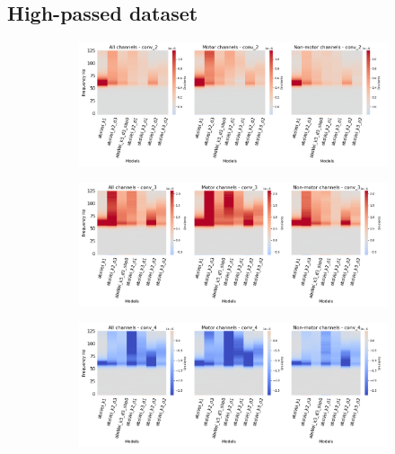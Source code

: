 \subsection*{High-passed dataset}\label{subsec:absVel-high-passed-dataset-appendixA}
\begin{figure}[!htpb]
\centering
\begin{subfigure}[a]{\textwidth}
   \includegraphics[width=1\linewidth]{img/appendix/A/conv-2/hp-m/absVel-model-gradients_all_kinds}
   \caption{}
   \label{fig:absVel-hp-grads-conv-2}
\end{subfigure}

\begin{subfigure}[b]{\textwidth}
   \includegraphics[width=1\linewidth]{img/appendix/A/conv-3/hp-m/absVel-model-gradients_all_kinds}
   \caption{}
   \label{fig:absVel-hp-grads-conv-3}
\end{subfigure}

\begin{subfigure}[c]{\textwidth}
   \includegraphics[width=1\linewidth]{img/appendix/A/conv-4/hp-m/absVel-model_gradients_all_kinds}
   \caption{}
   \label{fig:absVel-hp-grads-conv-4}
\end{subfigure}


\end{figure}
